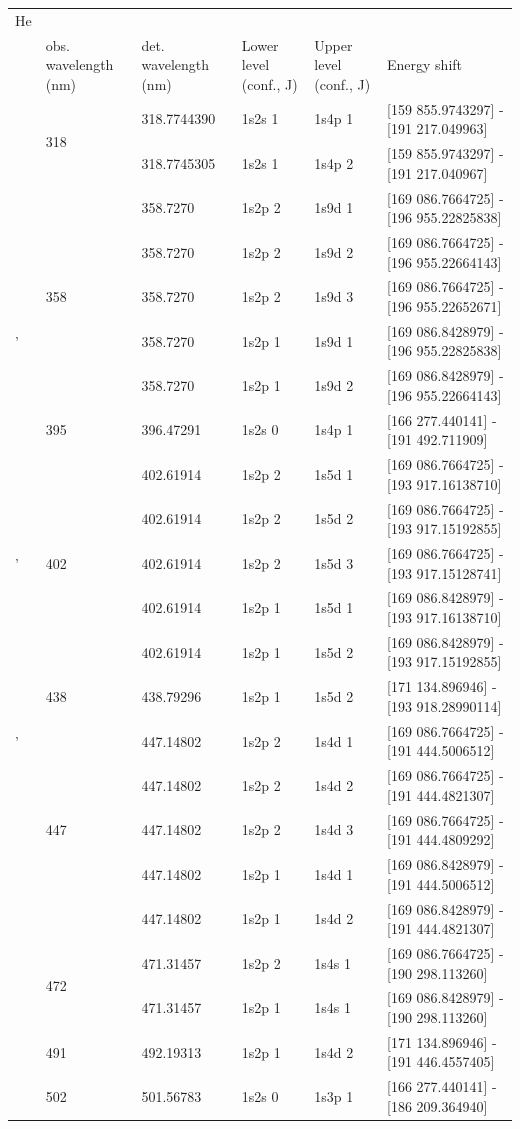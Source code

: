 \tabcolsep=0.11cm
\begin{tabular}{|l|l|l|l|l|l|}\hline
	He & \multicolumn{5}{c}{} \\ 
	&  obs. wavelength (nm) & det. wavelength (nm) & Lower level (conf., J) & Upper level (conf., J) & Energy shift \\
	& \multirow{2}{*}{318} & 318.7744390& 1s2s  1& 1s4p  1& [159 855.9743297] 	- 	[191 217.049963] \\
	& & 318.7745305 & 1s2s  1& 1s4p  2& [159 855.9743297] 	- 	[191 217.040967] \\
	& \multirow{5}{*}{358}& 358.7270 & 1s2p  2& 1s9d  1& [169 086.7664725] 	- 	[196 955.22825838] \\
	& & 358.7270 & 1s2p  2& 1s9d  2& [169 086.7664725] 	- 	[196 955.22664143]\\
	& & 358.7270 & 1s2p  2& 1s9d  3& [169 086.7664725] 	- 	[196 955.22652671]\\'
	& & 358.7270 & 1s2p  1& 1s9d  1& [169 086.8428979] 	- 	[196 955.22825838]\\
	& & 358.7270 & 1s2p  1& 1s9d  2& [169 086.8428979] 	- 	[196 955.22664143]\\
	& 395 & 396.47291& 1s2s  0& 1s4p  1& [166 277.440141]  	- 	[191 492.711909] \\
	& \multirow{5}{*}{402} & 402.61914 &1s2p  2& 1s5d 1& [169 086.7664725] 	- 	[193 917.16138710]\\
	& & 402.61914& 1s2p  2&1s5d  2& [169 086.7664725] 	- 	[193 917.15192855] \\'
	& & 402.61914& 1s2p  2&1s5d  3& [169 086.7664725] 	- 	[193 917.15128741] \\
	& & 402.61914& 1s2p  1&1s5d  1& [169 086.8428979] 	- 	[193 917.16138710]  \\
	& & 402.61914& 1s2p  1&1s5d  2&[169 086.8428979] 	- 	[193 917.15192855] \\
	& 438& 438.79296 & 1s2p  1&  1s5d  2& [171 134.896946]  	- 	[193 918.28990114]\\'
	& \multirow{5}{*}{447}& 447.14802& 1s2p  2& 1s4d  1& [169 086.7664725] 	- 	[191 444.5006512]\\
	& & 447.14802 & 1s2p  2& 1s4d  2& [169 086.7664725] 	- 	[191 444.4821307]\\
	& & 447.14802 & 1s2p  2& 1s4d  3& [169 086.7664725] 	- 	[191 444.4809292]\\
	& & 447.14802 & 1s2p  1& 1s4d  1& [169 086.8428979] 	- 	[191 444.5006512] \\
	& & 447.14802 & 1s2p  1& 1s4d  2& [169 086.8428979] 	- 	[191 444.4821307]\\
	& \multirow{2}{*}{472}& 471.31457& 1s2p  2& 1s4s 1& [169 086.7664725] 	- 	[190 298.113260] \\
	& & 471.31457&  1s2p  1&  1s4s  1& [169 086.8428979] 	- 	[190 298.113260] \\
	& 491 & 492.19313 & 1s2p  1&  1s4d  2& [171 134.896946]  	- 	[191 446.4557405]\\
	&502 & 501.56783& 1s2s  0& 1s3p  1& [166 277.440141]  	- 	[186 209.364940] \\
	\hline
	
\end{tabular}


